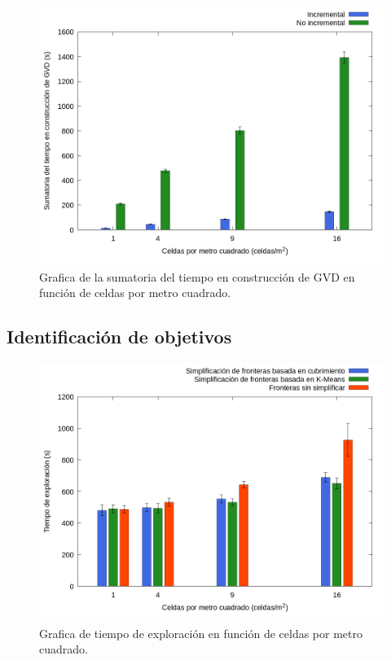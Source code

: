 \begin{figure}[H]
  \centerfloat

  \includegraphics[clip=true, width=\graphlen]{imagenes/graficas_chicas/graficas_histo_num/incrementalidad/gvd_construction_time_sum.png}

  \caption{Grafica de la sumatoria del tiempo en construcción de GVD en función de celdas por metro cuadrado.}\label{fig:gra:inc:gvdt}

\end{figure}


\subsection{Identificación de objetivos}\label{sec:exp:idobj}




\begin{figure}[H]
  \centerfloat

  \includegraphics[clip=true, width=\graphlen]{imagenes/graficas_chicas/graficas_histo_num/ident_obj/exploration_time.png}

  \caption{Grafica de tiempo de exploración en función de celdas por metro cuadrado.}\label{fig:gra:idobj:et}

\end{figure}

